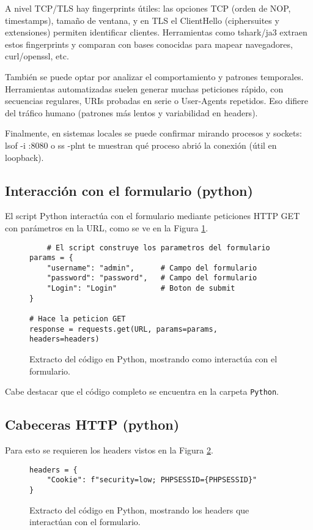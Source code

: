 \documentclass[letter,12pt]{article}
\begin{document}
A nivel TCP/TLS hay fingerprints útiles: las opciones TCP (orden de NOP, timestamps), tamaño de ventana, y en TLS el ClientHello (ciphersuites y extensiones) permiten identificar clientes. Herramientas como tshark/ja3 extraen estos fingerprints y comparan con bases conocidas para mapear navegadores, curl/openssl, etc.

También se puede optar por analizar el comportamiento y patrones temporales. Herramientas automatizadas suelen generar muchas peticiones rápido, con secuencias regulares, URIs probadas en serie o User‑Agents repetidos. Eso difiere del tráfico humano (patrones más lentos y variabilidad en headers).

Finalmente, en sistemas locales se puede confirmar mirando procesos y sockets: lsof -i :8080 o ss -plnt te muestran qué proceso abrió la conexión (útil en loopback).

\subsection{Interacción con el formulario (python)}
El script Python interactúa con el formulario mediante peticiones HTTP GET con parámetros en la URL, como se ve en la Figura \ref{actividad 1.18 script}.

\begin{figure}[H]
    \centering
    \begin{verbatim}
    # El script construye los parametros del formulario
params = {
    "username": "admin",      # Campo del formulario
    "password": "password",   # Campo del formulario
    "Login": "Login"          # Boton de submit
}

# Hace la peticion GET
response = requests.get(URL, params=params, headers=headers)
    \end{verbatim}  
    \caption{Extracto del código en Python, mostrando como interactúa con el formulario.}
    \label{actividad 1.18 script}
\end{figure}

Cabe destacar que el código completo se encuentra en la carpeta \verb|Python|.

\subsection{Cabeceras HTTP (python)}
Para esto se requieren los headers vistos en la Figura \ref{actividad 1.18 headers}.

\begin{figure}[H]
    \centering
    \begin{verbatim}
headers = {
    "Cookie": f"security=low; PHPSESSID={PHPSESSID}"
}
    \end{verbatim}  
    \caption{Extracto del código en Python, mostrando los headers que interactúan con el formulario.}
    \label{actividad 1.18 headers}
\end{figure}
\end{document}
